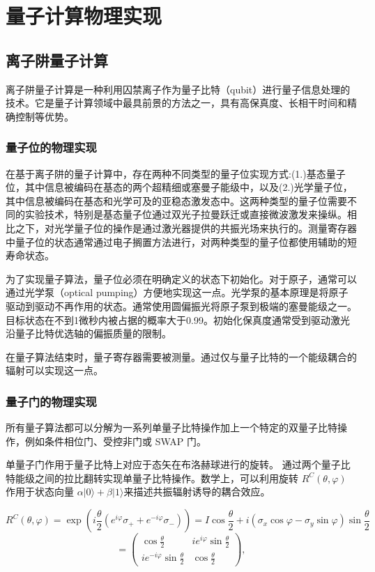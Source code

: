 \section{量子计算物理实现}
\subsection{离子阱量子计算}
离子阱量子计算是一种利用囚禁离子作为量子比特（qubit）进行量子信息处理的技术。它是量子计算领域中最具前景的方法之一，具有高保真度、长相干时间和精确控制等优势。
\subsubsection{量子位的物理实现}
在基于离子阱的量子计算中，存在两种不同类型的量子位实现方式:(1.)基态量子位，其中信息被编码在基态的两个超精细或塞曼子能级中，以及(2.)光学量子位，其中信息被编码在基态和光学可及的亚稳态激发态中。这两种类型的量子位需要不同的实验技术，特别是基态量子位通过双光子拉曼跃迁或直接微波激发来操纵。相比之下，对光学量子位的操作是通过激光器提供的共振光场来执行的。测量寄存器中量子位的状态通常通过电子搁置方法进行，对两种类型的量子位都使用辅助的短寿命状态。

为了实现量子算法，量子位必须在明确定义的状态下初始化。对于原子，通常可以通过光学泵（optical pumping）方便地实现这一点。光学泵的基本原理是将原子驱动到驱动不再作用的状态。通常使用圆偏振光将原子泵到极端的塞曼能级之一。目标状态在不到1微秒内被占据的概率大于0.99。初始化保真度通常受到驱动激光沿量子比特优选轴的偏振质量的限制。

在量子算法结束时，量子寄存器需要被测量。通过仅与量子比特的一个能级耦合的辐射可以实现这一点。

\subsubsection{量子门的物理实现}
所有量子算法都可以分解为一系列单量子比特操作加上一个特定的双量子比特操作，例如条件相位门、受控非门或 SWAP 门。


单量子门作用于量子比特上对应于态矢在布洛赫球进行的旋转。
通过两个量子比特能级之间的拉比翻转实现单量子比特操作。数学上，可以利用旋转 $R^C(\theta, \varphi)$ 作用于状态向量 $\alpha |0\rangle + \beta |1\rangle$来描述共振辐射诱导的耦合效应。

\[
R^C(\theta, \varphi) = \exp \left( i \frac{\theta}{2} \left( e^{i \varphi} \sigma_+ + e^{-i \varphi} \sigma_- \right) \right) = I \cos \frac{\theta}{2} + i (\sigma_x \cos \varphi - \sigma_y \sin \varphi) \sin \frac{\theta}{2}
\]
\[
= \begin{pmatrix} \cos \frac{\theta}{2} & i e^{i \varphi} \sin \frac{\theta}{2} \\ i e^{-i \varphi} \sin \frac{\theta}{2} & \cos \frac{\theta}{2} \end{pmatrix},
\]

